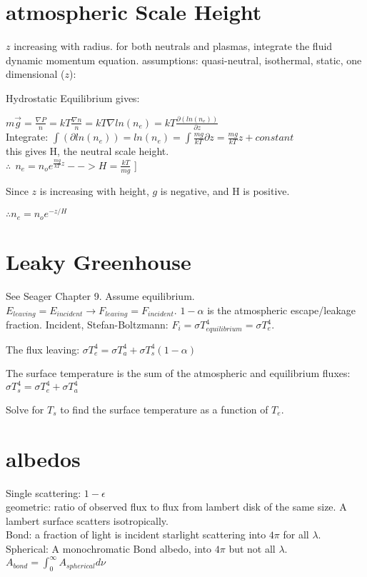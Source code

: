 \documentclass[12pt]{report}
\begin{document}
\section{atmospheric Scale Height}

$z$ increasing with radius.
for both neutrals and plasmas, integrate the fluid dynamic momentum equation. assumptions: quasi-neutral, isothermal, static, one dimensional ($z$):

Hydrostatic Equilibrium  gives:

$ m\vec{g}= \frac{\nabla P}{n}  = kT\frac{\nabla n}{n}= k T \nabla ln(n_e)= kT \frac{\partial (ln(n_e))}{\partial z}$\\

Integrate: $\int (\partial ln(n_e))=ln(n_e)=\int \frac{mg}{ kT}\partial z = \frac{mg}{ kT}z+constant$\\
this gives H, the neutral scale height.\\ $\therefore \ \
 n_e=n_o e^{\frac{mg}{ kT}z} -->H=\frac{ k T}{mg}$ ]
 
 Since $z$ is increasing with height, $g$ is negative, and H is positive.
 
 \(\therefore  n_e=n_o e^{-z/H}\)

\section{Leaky Greenhouse}
See Seager Chapter 9.
Assume equilibrium. $E_{leaving}=E_{incident}\rightarrow F_{leaving}=F_{incident}$.
$1-\alpha$ is the atmospheric escape/leakage fraction.
Incident, Stefan-Boltzmann: $F_i=\sigma T_{equilibrium}^4=\sigma T_{e}^4$.

The flux leaving: $\sigma T_e^4 = \sigma T_a^4+\sigma T_s^4(1-\alpha)$

The surface temperature is the sum of the atmospheric and equilibrium fluxes: 
\(\sigma T_s^4 =\sigma T_e^4+\sigma T_a^4\)

Solve for $T_s$ to find the surface temperature as a function of $T_e$.

\section{albedos}
Single scattering: $1-\epsilon$\\
geometric: ratio of observed flux to flux from lambert disk of the same size. A lambert surface scatters isotropically.\\
Bond: a fraction of light is incident starlight scattering into $4\pi$ for all $\lambda.$
Spherical: A monochromatic Bond albedo, into $4\pi$ but not all $\lambda$.\\
\(A_{bond}=\int_0^\infty A_{spherical} d\nu \)
\end{document}
